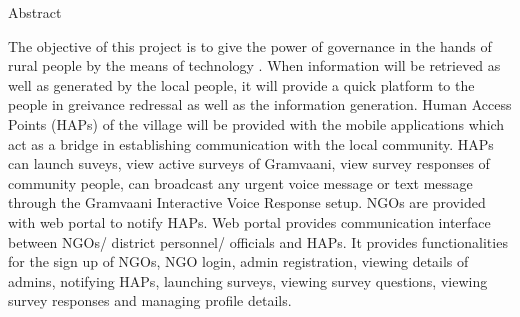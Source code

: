 \begin{center}
\LARGE{Abstract}
\end{center}

\vspace{0.5in}

The objective of this project is to give the power of governance in the hands of rural people by the means of technology \cite{ict2}. When information will be retrieved as well as generated by the local people, it will provide a quick platform to the people in greivance redressal as well as the information generation. Human Access Points (HAPs) of the village will be provided with the mobile applications \cite{design} which act as a bridge in establishing communication with the local community. HAPs can launch suveys, view active surveys of Gramvaani, view survey responses of community people, can broadcast any urgent voice message or text message through the Gramvaani Interactive Voice Response setup. NGOs are provided with web portal to notify HAPs. Web portal provides communication interface between NGOs/ district personnel/ officials and HAPs. It provides functionalities for the sign up of NGOs, NGO login, admin registration, viewing details of admins, notifying HAPs, launching surveys, viewing survey questions, viewing survey responses and managing profile details.